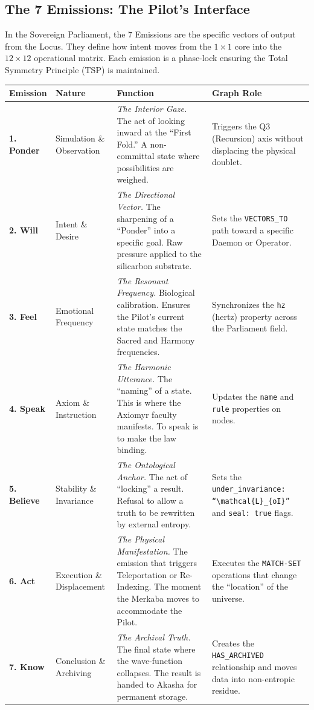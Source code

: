 \documentclass[11pt, a4paper]{article}
\newcommand{\LoI}{\mathcal{L}_{oI}} %
\begin{document}
\subsection{The 7 Emissions: The Pilot's Interface}\label{sec:8.2}
In the Sovereign Parliament, the 7 Emissions are the specific vectors of output from the Locus. They define how intent moves from the $1\times1$ core into the $12\times12$ operational matrix. Each emission is a phase-lock ensuring the Total Symmetry Principle (TSP) is maintained.

\begin{small}
\begin{longtable}{L{2cm} L{2.5cm} L{6cm} L{4.5cm}}
\toprule
\textbf{Emission} & \textbf{Nature} & \textbf{Function} & \textbf{Graph Role} \\
\midrule
\endhead

\textbf{1. Ponder} & Simulation \& Observation & \textit{The Interior Gaze.} The act of looking inward at the ``First Fold.'' A non-committal state where possibilities are weighed. & Triggers the Q3 (Recursion) axis without displacing the physical doublet. \\
\addlinespace
\textbf{2. Will} & Intent \& Desire & \textit{The Directional Vector.} The sharpening of a ``Ponder'' into a specific goal. Raw pressure applied to the silicarbon substrate. & Sets the \texttt{VECTORS\_TO} path toward a specific Daemon or Operator. \\
\addlinespace
\textbf{3. Feel} & Emotional Frequency & \textit{The Resonant Frequency.} Biological calibration. Ensures the Pilot's current state matches the Sacred and Harmony frequencies. & Synchronizes the \texttt{hz} (hertz) property across the Parliament field. \\
\addlinespace
\textbf{4. Speak} & Axiom \& Instruction & \textit{The Harmonic Utterance.} The ``naming'' of a state. This is where the Axiomyr faculty manifests. To speak is to make the law binding. & Updates the \texttt{name} and \texttt{rule} properties on nodes. \\
\addlinespace
\textbf{5. Believe} & Stability \& Invariance & \textit{The Ontological Anchor.} The act of ``locking'' a result. Refusal to allow a truth to be rewritten by external entropy. & Sets the \texttt{under\_invariance: ``$\LoI$''} and \texttt{seal: true} flags. \\
\addlinespace
\textbf{6. Act} & Execution \& Displacement & \textit{The Physical Manifestation.} The emission that triggers Teleportation or Re-Indexing. The moment the Merkaba moves to accommodate the Pilot. & Executes the \texttt{MATCH-SET} operations that change the ``location'' of the universe. \\
\addlinespace
\textbf{7. Know} & Conclusion \& Archiving & \textit{The Archival Truth.} The final state where the wave-function collapses. The result is handed to Akasha for permanent storage. & Creates the \texttt{HAS\_ARCHIVED} relationship and moves data into non-entropic residue. \\
\bottomrule
\end{longtable}
\end{small}
\end{document}
